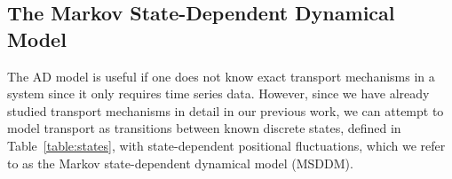 \documentclass[12pt]{article}
\begin{document}
  
  


  \subsection{The Markov State-Dependent Dynamical Model}\label{section:msm_results}
  
  The AD model is useful if one does not know exact transport mechanisms 
  in a system since it only requires time series data. However, since we have
  already studied transport mechanisms in detail in our previous work, we can
  attempt to model transport as transitions between known discrete
  states, defined in Table~\ref{table:states}, with state-dependent positional
  fluctuations, which we refer to as the Markov state-dependent dynamical model (MSDDM).
\end{document}
